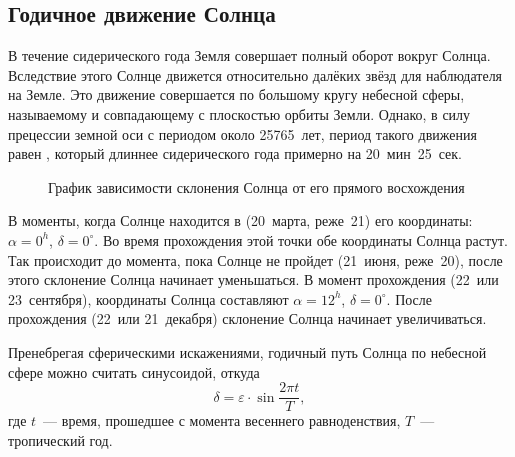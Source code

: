 \subsection{Годичное движение Солнца}
В течение сидерического года Земля совершает полный оборот вокруг Солнца. Вследствие этого Солнце движется относительно далёких звёзд для наблюдателя на Земле. Это движение совершается по большому кругу небесной сферы, называемому  и совпадающему с плоскостью орбиты Земли. Однако, в силу прецессии земной оси с периодом около 25765~лет, период такого движения равен , который длиннее сидерического года примерно на 20~мин~25~сек.

\begin{wrapfigure}[12]{r}{0.5\tw}
	\centering
	\vspace{-.9pc}
	\caption{График зависимости склонения Солнца от его прямого восхождения}
\end{wrapfigure}
В моменты, когда Солнце находится в   (20~марта, реже~21) его координаты: $\alpha=0^h$, $\delta=0^{\circ}$. Во время прохождения этой точки обе координаты Солнца растут. Так происходит до момента, пока Солнце не пройдет  (21~июня, реже~20), после этого склонение Солнца начинает уменьшаться. В момент прохождения  (22~или 23~сентября), координаты Солнца составляют $\alpha=12^h$, $\delta=0^{\circ}$. После прохождения  (22~или 21~декабря) склонение Солнца начинает увеличиваться.

Пренебрегая сферическими искажениями, годичный путь Солнца по небесной сфере можно считать синусоидой, откуда
\begin{equation}
	\delta=\varepsilon\cdot\sin \frac{2 \pi t}{T},
\end{equation}
где $t$~--- время, прошедшее с момента весеннего равноденствия, $T$~--- тропический год.

